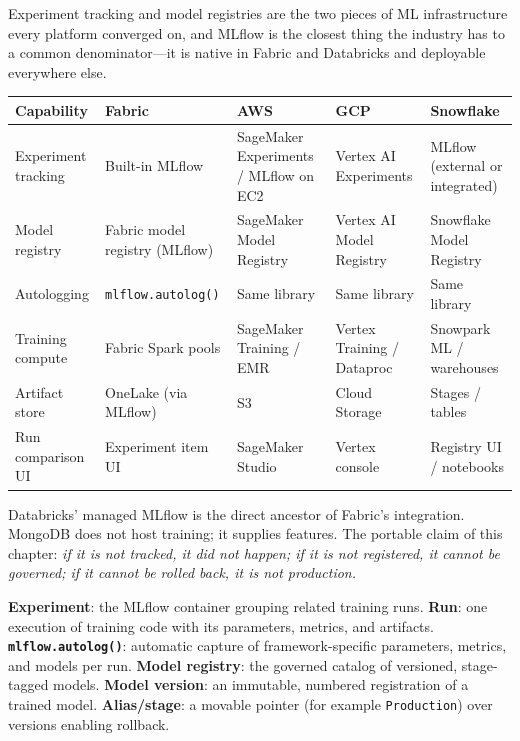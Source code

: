 \begin{crosscloud}
Experiment tracking and model registries are the two pieces of ML infrastructure every platform converged on, and MLflow is the closest thing the industry has to a common denominator---it is native in Fabric and Databricks and deployable everywhere else.

\vspace{2mm}
{\footnotesize
\begin{tabular}{@{}p{2.8cm}p{3.2cm}p{3.2cm}p{3.2cm}p{3.2cm}@{}}
\toprule
\textbf{Capability} & \textbf{Fabric} & \textbf{AWS} & \textbf{GCP} & \textbf{Snowflake} \\
\midrule
Experiment tracking & Built-in MLflow & SageMaker Experiments / MLflow on EC2 & Vertex AI Experiments & MLflow (external or integrated) \\
Model registry & Fabric model registry (MLflow) & SageMaker Model Registry & Vertex AI Model Registry & Snowflake Model Registry \\
Autologging & \texttt{mlflow.autolog()} & Same library & Same library & Same library \\
Training compute & Fabric Spark pools & SageMaker Training / EMR & Vertex Training / Dataproc & Snowpark ML / warehouses \\
Artifact store & OneLake (via MLflow) & S3 & Cloud Storage & Stages / tables \\
Run comparison UI & Experiment item UI & SageMaker Studio & Vertex console & Registry UI / notebooks \\
\bottomrule
\end{tabular}}

\vspace{1mm}
Databricks' managed MLflow is the direct ancestor of Fabric's integration. MongoDB does not host training; it supplies features. The portable claim of this chapter: \emph{if it is not tracked, it did not happen; if it is not registered, it cannot be governed; if it cannot be rolled back, it is not production.}
\end{crosscloud}

\begin{keyterms}
\textbf{Experiment}: the MLflow container grouping related training runs. \quad
\textbf{Run}: one execution of training code with its parameters, metrics, and artifacts. \quad
\textbf{\texttt{mlflow.autolog()}}: automatic capture of framework-specific parameters, metrics, and models per run. \quad
\textbf{Model registry}: the governed catalog of versioned, stage-tagged models. \quad
\textbf{Model version}: an immutable, numbered registration of a trained model. \quad
\textbf{Alias/stage}: a movable pointer (for example \texttt{Production}) over versions enabling rollback.
\end{keyterms}

